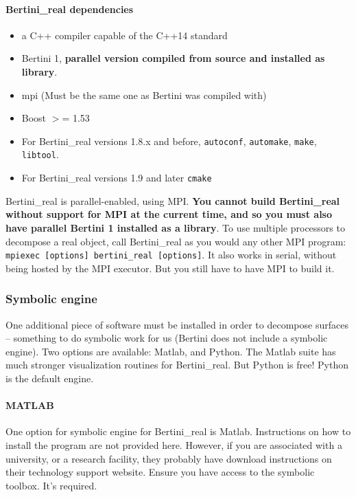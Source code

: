 \paragraph{Bertini\_real dependencies}

\begin{itemize}[noitemsep]
\item a C++ compiler capable of the C++14 standard
\item Bertini 1, {\bf parallel version compiled from source and installed as library}.
\item \gls{mpi} (Must be the same one as Bertini was compiled with)
\item Boost $>$= 1.53
\item For Bertini\_real versions 1.8.x and before, {\tt autoconf}, {\tt automake}, {\tt make}, {\tt libtool}.  
\item For Bertini\_real versions 1.9 and later {\tt cmake}
\end{itemize} 



Bertini\_real is parallel-enabled, using MPI.  {\bf You cannot build Bertini\_real without support for MPI at the current time, and so you must also have parallel Bertini 1 installed as a library}.  To use multiple processors to decompose a real object, call Bertini\_real as you would any other MPI program: \texttt{mpiexec [options] bertini\_real [options]}.  It also works in serial, without being hosted by the MPI executor.  But you still have to have MPI to build it.  


\subsubsection{Symbolic engine}

One additional piece of software must be installed in order to decompose surfaces -- something to do symbolic work for us (Bertini does not include a symbolic engine).  Two options are available:  Matlab, and Python.  The Matlab suite has much stronger visualization routines for Bertini\_real.  But Python is free!  Python is the default engine.

	\paragraph*{MATLAB}
One option for symbolic engine for Bertini\_real is Matlab.  Instructions on how to install the program are not provided here. However, if you are associated with a university, or a research facility, they probably have download instructions on their technology support website.   Ensure you have access to the symbolic toolbox.  It's required.


